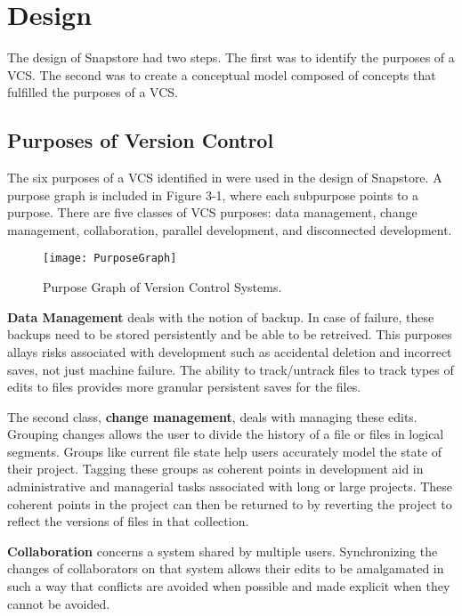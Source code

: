 \chapter{Design}

The design of Snapstore had two steps. The first was to identify the purposes of a VCS. The second was to create a conceptual model composed of concepts that fulfilled the purposes of a VCS.

\section{Purposes of Version Control}

The six purposes of a VCS identified in \cite{RossoJackson} were used in the design of Snapstore. A purpose graph is included in Figure 3-1, where each subpurpose points to a purpose. There are five classes of VCS purposes: data management, change management, collaboration, parallel development, and disconnected development.

\begin{figure}
\texttt{[image: PurposeGraph]}
\caption{Purpose Graph of Version Control Systems.}
\label{arm:fig1}
\end{figure}

\textbf{Data Management} deals with the notion of backup. In case of failure, these backups need to be stored persistently and be able to be retreived. This purposes allays risks associated with development such as accidental deletion and incorrect saves, not just machine failure. The ability to track/untrack files to track types of edits to files provides more granular persistent saves for the files.

The second class, \textbf{change management}, deals with managing these edits. Grouping changes allows the user to divide the history of a file or files in logical segments. Groups like current file state help users accurately model the state of their project. Tagging these groups as coherent points in development aid in administrative and managerial tasks associated with long or large projects. These coherent points in the project can then be returned to by reverting the project to reflect the versions of files in that collection.

\textbf{Collaboration} concerns a system shared by multiple users. Synchronizing the changes of collaborators on that system allows their edits to be amalgamated in such a way that conflicts are avoided when possible and made explicit when they cannot be avoided.

